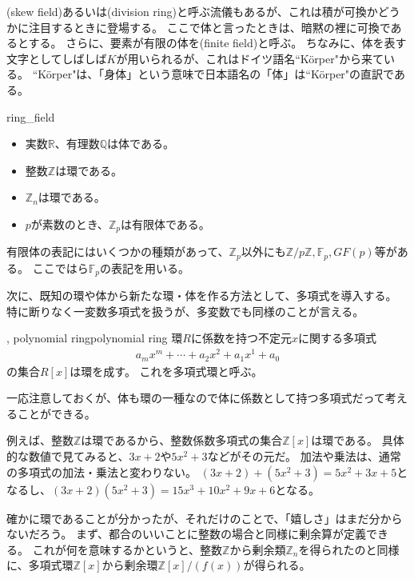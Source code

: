 (skew field)あるいは(division ring)と呼ぶ流儀もあるが、これは積が可換かどうかに注目するときに登場する。
ここで体と言ったときは、暗黙の裡に可換であるとする。
さらに、要素が有限の体を(finite field)と呼ぶ。
ちなみに、体を表す文字としてしばしば$K$が用いられるが、これはドイツ語名``Körper"から来ている。
``Körper"は、「身体」という意味で日本語名の「体」は``Körper"の直訳である。

\begin{Exam}{}{ring_field}\;
\begin{itemize}
 \item 実数$\mathbb{R}$、有理数$\mathbb{Q}$は体である。
 \item 整数$\mathbb{Z}$は環である。
 \item $\mathbb{Z}_n$は環である。
 \item $p$が素数のとき、$\mathbb{Z}_p$は有限体である。
\end{itemize}
\end{Exam}

有限体の表記にはいくつかの種類があって、$\mathbb{Z}_p$以外にも$\mathbb{Z}/p\mathbb{Z}, \mathbb{F}_p, GF(p)$等がある。
ここではら$\mathbb{F}_p$の表記を用いる。

次に、既知の環や体から新たな環・体を作る方法として、多項式を導入する。
特に断りなく一変数多項式を扱うが、多変数でも同様のことが言える。

\begin{Defi}{, polynomial ring}{polynomial ring}
環$R$に係数を持つ不定元$x$に関する多項式
\begin{align*}
a_mx^m + \cdots + a_2x^2 + a_1x^1 + a_0
\end{align*}
の集合$R[x]$は環を成す。
これを多項式環と呼ぶ。
\end{Defi}

一応注意しておくが、体も環の一種なので体に係数として持つ多項式だって考えることができる。

例えば、整数$\mathbb{Z}$は環であるから、整数係数多項式の集合$\mathbb{Z}[x]$は環である。
具体的な数値で見てみると、$3x+2$や$5x^2+3$などがその元だ。
加法や乗法は、通常の多項式の加法・乗法と変わりない。
$(3x+2)+(5x^2+3)=5x^2+3x+5$となるし、$(3x+2)(5x^2+3)=15x^3+10x^2+9x+6$となる。

確かに環であることが分かったが、それだけのことで、「嬉しさ」はまだ分からないだろう。
まず、都合のいいことに整数の場合と同様に剰余算が定義できる。
これが何を意味するかというと、整数$\mathbb{Z}$から剰余類$\mathbb{Z}_n$を得られたのと同様に、多項式環$\mathbb{Z}[x]$から剰余環$\mathbb{Z}[x]/(f(x))$が得られる。

